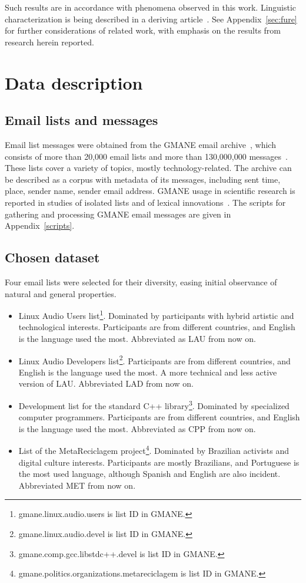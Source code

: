 \documentclass[%
 aip,
 jmp,%
 amsmath,amssymb,
 reprint,%
]{revtex4-1}
\begin{document}
 Such results are in accordance with phenomena observed in this work. Linguistic characterization is being described in a deriving article~\cite{rcText}. See Appendix~\ref{sec:fure} for further considerations of related work, with emphasis on the results from research herein reported.

\section{Data description}
    \subsection{Email lists and messages}
Email list messages were obtained from
the GMANE email archive~\cite{GMANE}, which consists of more than 20,000 email lists and more than 130,000,000 messages~\cite{GMANEwikipedia}. These lists cover a variety of topics, mostly technology-related. The archive can be described as a corpus with metadata of its messages, including sent time, place, sender name, sender email address.
GMANE usage in scientific research is reported in studies of isolated lists and of lexical innovations~\cite{GMANE2,bird}. The scripts for gathering and processing GMANE email messages are given in Appendix~\ref{scripts}.

    \subsection{Chosen dataset}
Four email lists were selected for their diversity, easing initial observance of natural and general properties.
\begin{itemize}
    \item Linux Audio Users list\footnote{gmane.linux.audio.users is list ID in GMANE.}. Dominated by participants with hybrid artistic and technological interests. Participants are from different countries, and English is the language used the most. Abbreviated as LAU from now on.
    \item Linux Audio Developers list\footnote{gmane.linux.audio.devel is list ID in GMANE.}. Participants are from different countries, and English is the language used the most. A more technical and less active version of LAU. Abbreviated LAD from now on.
    \item Development list for the standard C++ library\footnote{gmane.comp.gcc.libstdc++.devel is list ID in GMANE.}. Dominated by specialized computer programmers. Participants are from different countries, and English is the language used the most. Abbreviated as CPP from now on.
    \item List of the MetaReciclagem project\footnote{gmane.politics.organizations.metareciclagem is list ID in GMANE.}. Dominated by Brazilian activists and digital culture interests. Participants are mostly Brazilians, and Portuguese is the most used language, although Spanish and English are also incident. Abbreviated MET from now on.
\end{itemize} 
\end{document}
